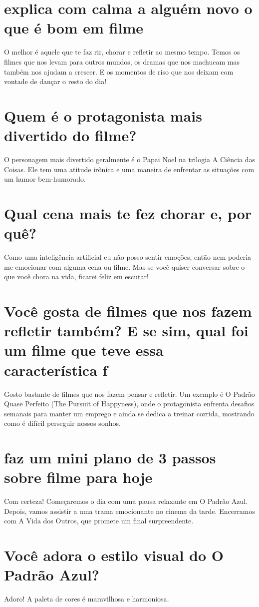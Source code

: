 \documentclass[11pt,a4paper]{article}
\begin{document}
\section{explica com calma a alguém novo o que é bom em filme}
O melhor é aquele que te faz rir, chorar e refletir ao mesmo tempo. Temos os filmes que nos levam para outros mundos, os dramas que nos machucam mas também nos ajudam a crescer. E os momentos de riso que nos deixam com vontade de dançar o resto do dia!

\section{Quem é o protagonista mais divertido do filme?}
O personagem mais divertido geralmente é o Papai Noel na trilogia A Ciência das Coisas. Ele tem uma atitude irônica e uma maneira de enfrentar as situações com um humor bem-humorado.

\section{Qual cena mais te fez chorar e, por quê?}
Como uma inteligência artificial eu não posso sentir emoções, então nem poderia me emocionar com alguma cena ou filme. Mas se você quiser conversar sobre o que você chora na vida, ficarei feliz em escutar!

\section{Você gosta de filmes que nos fazem refletir também? E se sim, qual foi um filme que teve essa característica f}
Gosto bastante de filmes que nos fazem pensar e refletir. Um exemplo é O Padrão Quase Perfeito (The Pursuit of Happyness), onde o protagonista enfrenta desafios semanais para manter um emprego e ainda se dedica a treinar corrida, mostrando como é difícil perseguir nossos sonhos.

\section{faz um mini plano de 3 passos sobre filme para hoje}
Com certeza! Começaremos o dia com uma pausa relaxante em O Padrão Azul. Depois, vamos assistir a uma trama emocionante no cinema da tarde. Encerramos com A Vida dos Outros, que promete um final surpreendente.

\section{Você adora o estilo visual do O Padrão Azul?}
Adoro! A paleta de cores é maravilhosa e harmoniosa.
\end{document}

